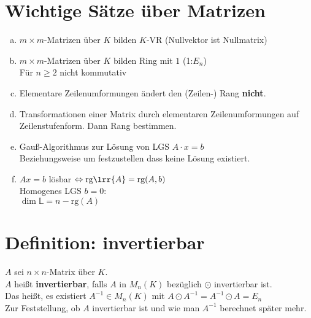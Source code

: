 \section{Wichtige Sätze über Matrizen}
	\begin{enumerate}[a)]
		\item $m\times m$-Matrizen über $K$ bilden $K$-VR (Nullvektor ist Nullmatrix)
		\item $m\times m$-Matrizen über $K$ bilden Ring mit $1$ (1:$E_n$)\\
			Für $n\geq 2$ nicht kommutativ
		\item Elementare Zeilenumformungen ändert den (Zeilen-) Rang \textbf{nicht}.
		\item Transformationen einer Matrix durch elementaren Zeilenumformungen auf \\
			Zeilenstufenform. Dann Rang bestimmen.
		\item Gauß-Algorithmus zur Lösung von LGS $A\cdot x=b$\\
			Beziehungsweise um festzustellen dass keine Lösung existiert.
		\item $Ax=b$ lösbar $\Leftrightarrow \mbox{rg}\lrr{A}=\mbox{rg}(A,b)$\\
			Homogenes LGS $b=0$:\\
			$\dim\mathbb{L}=n-\mbox{rg}(A)$
	\end{enumerate}

\section{Definition: invertierbar}
	$A$ sei $n\times n$-Matrix über $K$.\\
	$A$ heißt \textbf{invertierbar}, falls $A$ in $M_n(K)$ bezüglich $\odot$ invertierbar ist.\\
	Das heißt, es existiert $A^{-1}\in M_n(K)$ mit $A\odot A^{-1}=A^{-1}\odot A=E_n$\\
	Zur Feststellung, ob $A$ invertierbar ist und wie man $A^{-1}$ berechnet später mehr.
